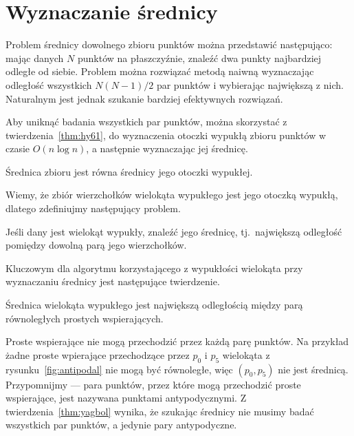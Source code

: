 \chapter{Wyznaczanie średnicy\label{chap:diameter}}
Problem średnicy dowolnego zbioru punktów można przedstawić
następująco: mając danych $N$ punktów na płaszczyźnie, znaleźć dwa
punkty najbardziej odległe od siebie. Problem można rozwiązać metodą
naiwną wyznaczając odległość wszystkich $N(N-1)/2$ par punktów i
wybierając największą z nich. Naturalnym jest jednak szukanie bardziej
efektywnych rozwiązań.

Aby uniknąć badania wszystkich par punktów, można skorzystać z
twierdzenia~\ref{thm:hy61}, do wyznaczenia otoczki wypukłą zbioru
punktów w czasie $O(n \log n)$\cite{Graham72}, a następnie wyznaczając jej średnicę.

\begin{twierdzenie}
  Średnica zbioru jest równa średnicy jego otoczki wypukłej.
\end{twierdzenie}

Wiemy, że zbiór wierzchołków wielokąta wypukłego jest jego otoczką
wypukłą, dlatego zdefiniujmy następujący problem.

\begin{problem}
  Jeśli dany jest wielokąt wypukły, znaleźć jego średnicę,
  tj.\ największą odległość pomiędzy dowolną parą jego wierzchołków.
\end{problem}

Kluczowym dla algorytmu korzystającego z wypukłości wielokąta przy
wyznaczaniu średnicy jest następujące twierdzenie.

\begin{twierdzenie}
\label{thm:yagbol}
  Średnica wielokąta wypukłego jest największą odległością między parą
  równoległych prostych wspierających.
\end{twierdzenie}

Proste wspierające nie mogą przechodzić przez każdą parę punktów. Na
przykład żadne proste wpierające przechodzące przez $p_0$ i $p_5$
wielokąta z rysunku~\ref{fig:antipodal} nie mogą być równoległe, więc
$(p_{0},p_{5})$ nie jest średnicą. Przypomnijmy --- para punktów,
przez które mogą przechodzić proste wspierające, jest nazywana
punktami antypodycznymi. Z twierdzenia~\ref{thm:yagbol} wynika, że
szukając średnicy nie musimy badać wszystkich par punktów, a jedynie
pary antypodyczne.


